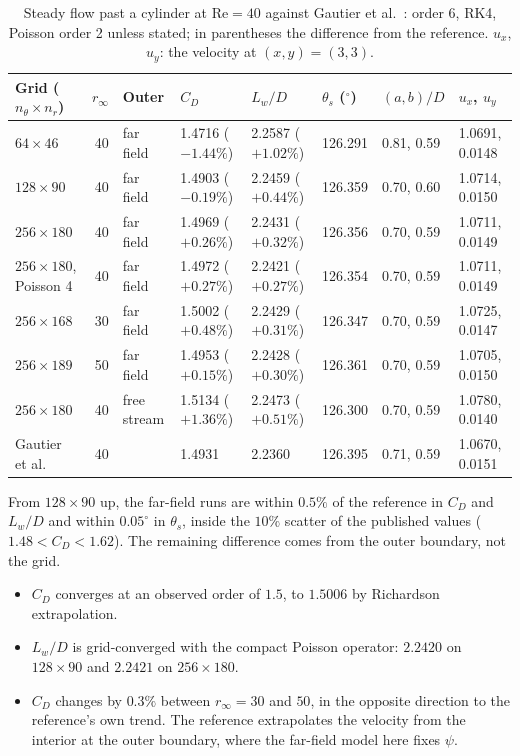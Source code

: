 \documentclass[11pt,a4paper]{article}
\newcommand{\Rey}{\mathrm{Re}}
\begin{document}
\begin{table}[ht]
\centering\footnotesize
\caption{Steady flow past a cylinder at $\Rey=40$ against Gautier et al.~\cite{gautier2013}: order 6, RK4, Poisson order 2 unless stated; in parentheses the difference from the reference.  $u_x$, $u_y$: the velocity at $(x,y)=(3,3)$.}
\label{tab:cylinder}
\setlength{\tabcolsep}{3pt}
\begin{tabular}{@{}lrllllll@{}}
\toprule
Grid ($n_\theta\times n_r$) & $r_\infty$ & Outer & $C_D$ & $L_w/D$ & $\theta_s$ ($^\circ$) & $(a,b)/D$ & $u_x$, $u_y$ \\
\midrule
$64\times46$ & 40 & far field & 1.4716 ($-1.44\%$) & 2.2587 ($+1.02\%$) & 126.291 & 0.81, 0.59 & 1.0691, 0.0148 \\
$128\times90$ & 40 & far field & 1.4903 ($-0.19\%$) & 2.2459 ($+0.44\%$) & 126.359 & 0.70, 0.60 & 1.0714, 0.0150 \\
$256\times180$ & 40 & far field & 1.4969 ($+0.26\%$) & 2.2431 ($+0.32\%$) & 126.356 & 0.70, 0.59 & 1.0711, 0.0149 \\
$256\times180$, Poisson 4 & 40 & far field & 1.4972 ($+0.27\%$) & 2.2421 ($+0.27\%$) & 126.354 & 0.70, 0.59 & 1.0711, 0.0149 \\
$256\times168$ & 30 & far field & 1.5002 ($+0.48\%$) & 2.2429 ($+0.31\%$) & 126.347 & 0.70, 0.59 & 1.0725, 0.0147 \\
$256\times189$ & 50 & far field & 1.4953 ($+0.15\%$) & 2.2428 ($+0.30\%$) & 126.361 & 0.70, 0.59 & 1.0705, 0.0150 \\
$256\times180$ & 40 & free stream & 1.5134 ($+1.36\%$) & 2.2473 ($+0.51\%$) & 126.300 & 0.70, 0.59 & 1.0780, 0.0140 \\
\midrule
Gautier et al. & 40 & & 1.4931 & 2.2360 & 126.395 & 0.71, 0.59 & 1.0670, 0.0151 \\
\bottomrule
\end{tabular}
\end{table}
From $128\times90$ up, the far-field runs are within $0.5\%$ of the reference in $C_D$ and $L_w/D$ and within $0.05^\circ$ in $\theta_s$, inside the $10\%$ scatter of the published values ($1.48<C_D<1.62$).  The remaining difference comes from the outer boundary, not the grid.
\begin{itemize}[leftmargin=2em]
  \item $C_D$ converges at an observed order of $1.5$, to $1.5006$ by Richardson extrapolation.
  \item $L_w/D$ is grid-converged with the compact Poisson operator: $2.2420$ on $128\times90$ and $2.2421$ on $256\times180$.
  \item $C_D$ changes by $0.3\%$ between $r_\infty=30$ and $50$, in the opposite direction to the reference's own trend.  The reference extrapolates the velocity from the interior at the outer boundary, where the far-field model here fixes $\psi$.
\end{itemize}
\end{document}
